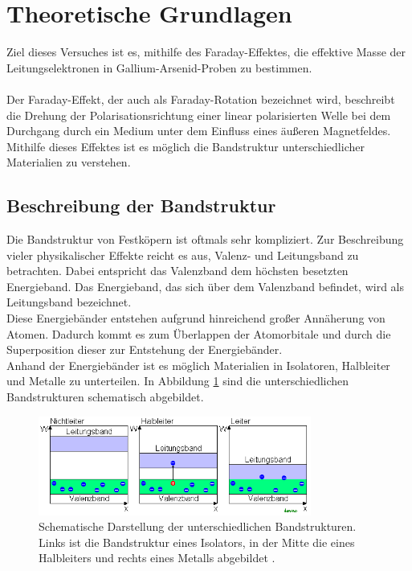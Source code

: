 \section{Theoretische Grundlagen}
Ziel dieses Versuches ist es, mithilfe des Faraday-Effektes, die effektive Masse der Leitungselektronen in
Gallium-Arsenid-Proben zu bestimmen. \\
\\
Der Faraday-Effekt, der auch als Faraday-Rotation bezeichnet wird, beschreibt die Drehung der
Polarisationsrichtung einer linear polarisierten Welle bei dem Durchgang durch ein Medium
unter dem Einfluss eines äußeren Magnetfeldes. Mithilfe dieses Effektes ist es möglich die
Bandstruktur unterschiedlicher Materialien zu verstehen. \\

\subsection{Beschreibung der Bandstruktur}
Die Bandstruktur von Festköpern ist oftmals sehr kompliziert. Zur Beschreibung vieler physikalischer
Effekte reicht es aus, Valenz- und Leitungsband zu betrachten.
Dabei entspricht das Valenzband dem höchsten besetzten Energieband. Das Energieband, das sich über dem
Valenzband befindet, wird als Leitungsband bezeichnet. \\
Diese Energiebänder entstehen aufgrund hinreichend großer Annäherung von Atomen. Dadurch kommt es zum
Überlappen der Atomorbitale und durch die Superposition dieser zur Entstehung der Energiebänder. \\
Anhand der Energiebänder ist es möglich Materialien in Isolatoren, Halbleiter und Metalle zu unterteilen.
In Abbildung \ref{fig:Bandstrukturen} sind die unterschiedlichen Bandstrukturen schematisch abgebildet.
\begin{figure}[H]
    \centering
    \includegraphics[width=0.8\textwidth]{images/Bandstruktur.png}
    \caption{Schematische Darstellung der unterschiedlichen Bandstrukturen. Links ist die Bandstruktur eines Isolators,
    in der Mitte die eines Halbleiters und rechts eines Metalls abgebildet \cite{BS}.}
    \label{fig:Bandstrukturen}
\end{figure} \noindent
